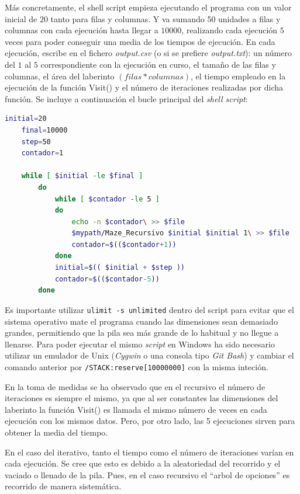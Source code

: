 \documentclass[12pt,a4paper]{article}
\begin{document}
\vspace{0.3cm}
Más concretamente, el shell script empieza ejecutando el programa con un valor inicial de $20$ tanto para filas y columnas. Y va sumando 50 unidades a filas y columnas con cada ejecución hasta llegar a $10000$, realizando cada ejecución $5$ veces para poder conseguir una media de los tiempos de ejecución. En cada ejecución, escribe en el fichero \textit{output.csv} (o si se prefiere \textit{output.txt}): un número del $1$ al $5$ correspondiente con la ejecución en curso, el tamaño de las filas y columnas, el área del laberinto $(filas*columnas)$, el tiempo empleado en la ejecución de la función \textsf{Visit()} y el número de iteraciones realizadas por dicha función. Se incluye a continuación el bucle principal del \textit{shell script}:
\clearpage
\lstset{style=mystyle}
\begin{lstlisting}[language=sh, title= Variente para la función \textsf{PrintGrid()} con carácteres \textsc{unicode}, frame=single, numbers=none]
	initial=20
	final=10000
	step=50
	contador=1
	
	while [ $initial -le $final ]
		do 
			while [ $contador -le 5 ]
			do
				echo -n $contador\ >> $file
				$mypath/Maze_Recursivo $initial $initial 1\ >> $file
				contador=$(($contador+1))
			done
			initial=$(( $initial + $step ))
			contador=$(($contador-5))
		done
\end{lstlisting}
Es importante utilizar \verb|ulimit -s unlimited| dentro del script para evitar que el sistema operativo mate el programa cuando las dimensiones sean demasiado grandes, permitiendo que la pila sea más grande de lo habitual y no llegue a llenarse. Para poder ejecutar el mismo \textit{script} en Windows ha sido necesario utilizar un emulador de Unix (\textit{Cygwin} o una consola tipo \textit{Git Bash}) y cambiar el comando anterior por \verb|/STACK:reserve[10000000]| con la misma inteción.

\vspace{0.3cm}
En la toma de medidas se ha observado que en el recursivo el número de iteraciones es siempre el mismo, ya que al ser constantes las dimensiones del laberinto la función \textsf{Visit()} es llamada el mismo número de veces en cada ejecución con los mismos datos. Pero, por otro lado, las 5 ejecuciones sirven para obtener la media del tiempo. 

\vspace{0.3cm}
En el caso del iterativo, tanto el tiempo como el número de iteraciones varían en cada ejecución. Se cree que esto es debido a la aleatoriedad del recorrido y el vaciado o llenado de la pila. Pues, en el caso recursivo el ``arbol de opciones'' es recorrido de manera sistemática.
\end{document}
